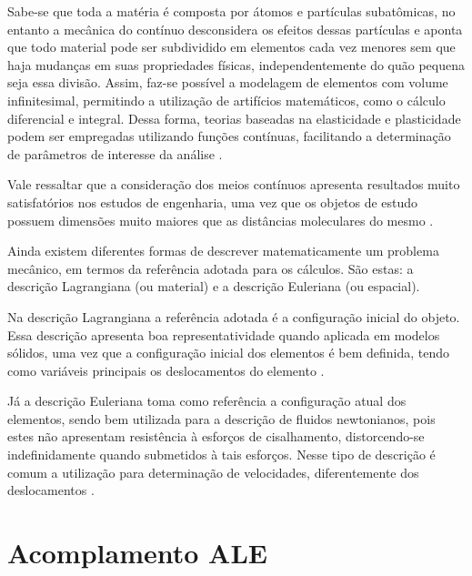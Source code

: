 \documentclass[_ArquivoPrincipal.tex]{subfiles}
\begin{document}
Sabe-se que toda a matéria é composta por átomos e partículas subatômicas, no entanto a mecânica do contínuo desconsidera os efeitos dessas partículas e aponta que todo material pode ser subdividido em elementos cada vez menores sem que haja mudanças em suas propriedades físicas, independentemente do quão pequena seja essa divisão. Assim, faz-se possível a modelagem de elementos com volume infinitesimal, permitindo a utilização de artifícios matemáticos, como o cálculo diferencial e integral. Dessa forma, teorias baseadas na elasticidade e plasticidade podem ser empregadas utilizando funções contínuas, facilitando a determinação de parâmetros de interesse da análise \cite{irgens2008continuum, lai2009introduction, malvern1969introduction}.

Vale ressaltar que a consideração dos meios contínuos apresenta resultados muito satisfatórios nos estudos de engenharia, uma vez que os objetos de estudo possuem dimensões muito maiores que as distâncias moleculares do mesmo \cite{malvern1969introduction, mase2009continuum}.

Ainda existem diferentes formas de descrever matematicamente um problema mecânico, em termos da referência adotada para os cálculos. São estas: a descrição Lagrangiana (ou material) e a descrição Euleriana (ou espacial).

Na descrição Lagrangiana a referência adotada é a configuração inicial do objeto. Essa descrição apresenta boa representatividade quando aplicada em modelos sólidos, uma vez que a configuração inicial dos elementos é bem definida, tendo como variáveis principais os deslocamentos do elemento \cite{sanches2014fluid, fernandes2019ale}.

Já a descrição Euleriana toma como referência a configuração atual dos elementos, sendo bem utilizada para a descrição de fluidos newtonianos, pois estes não apresentam resistência à esforços de cisalhamento, distorcendo-se indefinidamente quando submetidos à tais esforços. Nesse tipo de descrição é comum a utilização para determinação de velocidades, diferentemente dos deslocamentos \cite{sanches2014fluid, fernandes2019ale}.

\section{Acomplamento ALE} \label{ALE}
\end{document}

